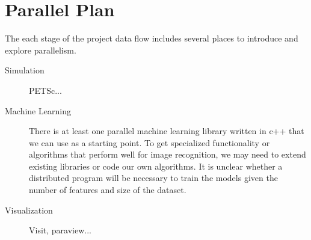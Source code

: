\section{Parallel Plan}

The each stage of the project data flow includes several places to introduce and explore parallelism.

\begin{description}
\item[Simulation] PETSc...
\item[Machine Learning] There is at least one parallel machine learning library written in c++ that we can use as a starting point.  To get specialized functionality or algorithms that perform well for image recognition, we may need to extend existing libraries or code our own algorithms.  It is unclear whether a distributed program will be necessary to train the models given the number of features and size of the dataset.
\item[Visualization] Visit, paraview...

\end{description}



